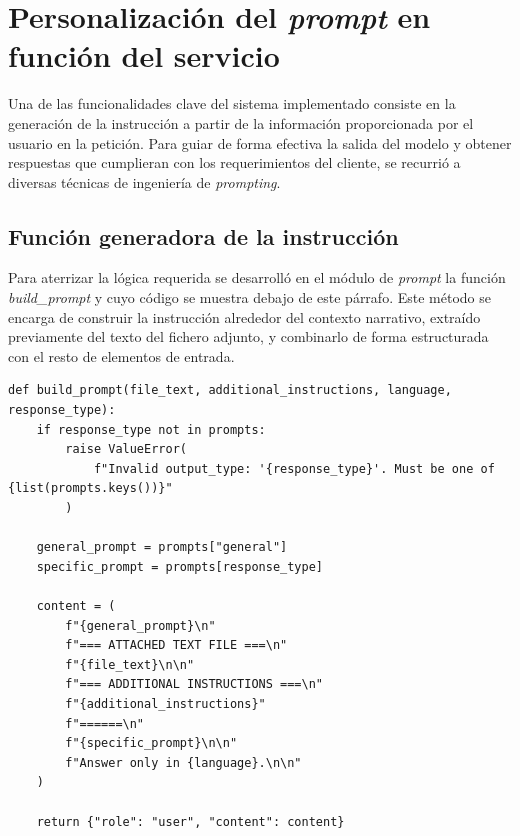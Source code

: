 \section{Personalización del \textit{prompt} en función del servicio}

Una de las funcionalidades clave del sistema implementado consiste en la generación de la instrucción
a partir de la información proporcionada por el usuario en la petición.
Para guiar de forma efectiva la salida del modelo y obtener respuestas que cumplieran con los requerimientos del cliente,
se recurrió a diversas técnicas de ingeniería de \textit{prompting}.

\subsection{Función generadora de la instrucción}
\label{subsec:prompt}
Para aterrizar la lógica requerida se desarrolló en el módulo de \textit{prompt} la función \textit{build\_prompt}
y cuyo código se muestra debajo de este párrafo.
Este método se encarga de construir la instrucción alrededor del contexto narrativo,
extraído previamente del texto del fichero adjunto,
y combinarlo de forma estructurada con el resto de elementos de entrada.

\pagebreak
\begin{lstlisting}[label=cod:prompt,caption=Estructura de la función que construye la instrucción para el modelo.]
def build_prompt(file_text, additional_instructions, language, response_type):
    if response_type not in prompts:
        raise ValueError(
            f"Invalid output_type: '{response_type}'. Must be one of {list(prompts.keys())}"
        )

    general_prompt = prompts["general"]
    specific_prompt = prompts[response_type]

    content = (
        f"{general_prompt}\n"
        f"=== ATTACHED TEXT FILE ===\n"
        f"{file_text}\n\n"
        f"=== ADDITIONAL INSTRUCTIONS ===\n"
        f"{additional_instructions}"
        f"======\n"
        f"{specific_prompt}\n\n"
        f"Answer only in {language}.\n\n"
    )

    return {"role": "user", "content": content}

\end{lstlisting}

